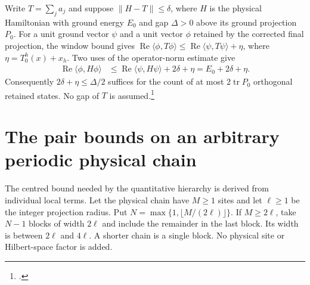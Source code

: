 \documentclass{article}
\begin{document}
Write $T=\sum_j a_j$ and suppose $\|H-T\|\le\delta$, where $H$ is the
physical Hamiltonian with ground energy $E_0$ and gap $\Delta>0$ above its
ground projection $P_0$. For a unit ground vector $\psi$ and a unit vector
$\phi$ retained by the corrected final projection, the window bound gives
$\operatorname{Re}\langle\phi,T\phi\rangle
\le\operatorname{Re}\langle\psi,T\psi\rangle+\eta$, where
$\eta=T_0^h(x)+x_h$. Two uses of the operator-norm estimate give
\begin{align}
 \operatorname{Re}\langle\phi,H\phi\rangle
 &\le\operatorname{Re}\langle\psi,H\psi\rangle+2\delta+\eta
 =E_0+2\delta+\eta.
 \label{eq:hastings05_physical_energy}
\end{align}
Consequently $2\delta+\eta\le\Delta/2$ suffices for the count of at most
$2\operatorname{tr}P_0$ orthogonal retained states. No gap of $T$ is
assumed.\footnote{.}

\section{The pair bounds on an arbitrary periodic physical chain}

The centred bound needed by the quantitative hierarchy is derived from
individual local terms. Let the physical chain have $M\ge1$ sites and let
$\ell\ge1$ be the integer projection radius. Put
$N=\max\{1,\lfloor M/(2\ell)\rfloor\}$. If $M\ge2\ell$, take $N-1$
blocks of width $2\ell$ and include the remainder in the last block. Its
width is between $2\ell$ and $4\ell$. A shorter chain is a single block.
No physical site or Hilbert-space factor is added.
\end{document}
